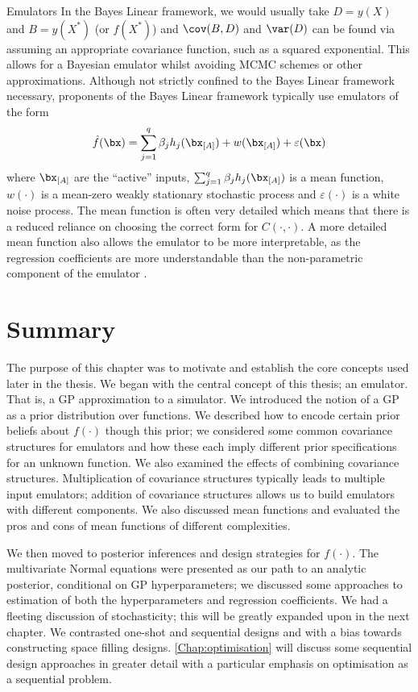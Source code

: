 \begin{chapter}{Emulators \label{Ch:Emulators}}
In the Bayes Linear framework, we would usually take $D = y(X)$ and $B = y(X^*)$ (or $f(X^*)$) and $\cov(B, D)$ and $\var(D)$ can be found via assuming an appropriate covariance function, such as a squared exponential. This allows for a Bayesian emulator whilst avoiding MCMC schemes or other approximations. Although not strictly confined to the Bayes Linear framework necessary, proponents of the Bayes Linear framework typically use emulators of the form
\begin{equation}
  \hat{f}(\bx) = \sum_{j = 1}^q \beta_j h_j(\bx_{[A]}) + w(\bx_{[A]}) + \varepsilon(\bx)
\end{equation}
where $\bx_{[A]}$ are the ``active'' inputs, $\sum_{j = 1}^q \beta_j h_j(\bx_{[A]})$ is a mean function, $w(\cdot)$ is a mean-zero weakly stationary stochastic process and $\varepsilon(\cdot)$ is a white noise process. The mean function is often very detailed which means that there is a reduced reliance on choosing the correct form for $C(\cdot, \cdot)$. A more detailed mean function also allows the emulator to be more interpretable, as the regression coefficients are more understandable than the non-parametric component of the emulator \citep{Bower2010, Vernon2019}.
\section{Summary}
The purpose of this chapter was to motivate and establish the core concepts used later in the thesis. We began with the central concept of this thesis; an emulator. That is, a GP approximation to a simulator. We introduced the notion of a GP as a prior distribution over functions. We described how to encode certain prior beliefs about $f(\cdot)$ though this prior; we considered some common covariance structures for emulators and how these each imply different prior specifications for an unknown function. We also examined the effects of combining covariance structures. Multiplication of covariance structures typically leads to multiple input emulators; addition of covariance structures allows us to build emulators with different components.  We also discussed mean functions and evaluated the pros and cons of mean functions of different complexities.

We then moved to posterior inferences and design strategies for $f(\cdot)$. The multivariate Normal equations were presented as our path to an analytic posterior, conditional on GP hyperparameters; we discussed some approaches to estimation of both the hyperparameters and regression coefficients. We had a fleeting discussion of stochasticity; this will be greatly expanded upon in the next chapter. We contrasted one-shot and sequential designs and with a bias towards constructing space filling designs. \cref{Chap:optimisation} will discuss some sequential design approaches in greater detail with a particular emphasis on optimisation as a sequential problem.


\end{chapter}
